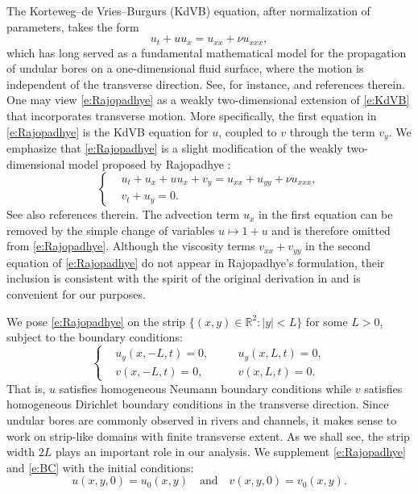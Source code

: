 \documentclass[final,11pt]{article}
\theoremstyle{definition} %
\theoremstyle{plain}
\theoremstyle{definition} %
\theoremstyle{remark}
\begin{document}
The Korteweg--de Vries--Burgurs (KdVB) equation, after normalization of parameters, takes the form
\begin{equation}\label{e:KdVB}
u_t + u u_x = u_{xx} + \nu u_{xxx},
\end{equation}
which has long served as a fundamental mathematical model for the propagation of undular bores on a one-dimensional fluid surface, where the motion is independent of the transverse direction. See, for instance, \cite{BARKER2025} and references therein. 
One may view \eqref{e:Rajopadhye} as a weakly two-dimensional extension of \eqref{e:KdVB} that incorporates transverse motion. More specifically, the first equation in \eqref{e:Rajopadhye} is the KdVB equation for $u$, coupled to $v$ through the term $v_y$. We emphasize that \eqref{e:Rajopadhye} is a slight modification of the weakly two-dimensional model proposed by Rajopadhye \cite{Raj1996}:
\[
\left\{\begin{aligned}
&u_t  +u_x + u u_x  + v_y = u_{xx} + u_{yy} + \nu u_{xxx}, \\
&v_t + u_y = 0.
\end{aligned}\right.
\]
See also references therein. The advection term $u_x$ in the first equation can be removed by the simple change of variables $u \mapsto 1+u$ and is therefore omitted from \eqref{e:Rajopadhye}. Although the viscosity terms $v_{xx}+v_{yy}$ in the second equation of \eqref{e:Rajopadhye} do not appear in Rajopadhye's formulation, their inclusion is consistent with the spirit of the original derivation in \cite{Raj1996} and is convenient for our purposes.    

We pose \eqref{e:Rajopadhye} on the strip $\{(x,y)\in \mathbb{R}^2: |y|<L\}$ for some $L>0$, subject to the boundary conditions: 
\begin{equation}\label{e:BC}
\left\{\begin{aligned}
& u_y(x,-L,t)=0, \quad& &u_y(x,L,t)=0,\\
& v(x,-L,t)=0, & &v(x,L,t)=0.
\end{aligned}\right.
\end{equation}
That is, $u$ satisfies homogeneous Neumann boundary conditions while $v$ satisfies homogeneous Dirichlet boundary conditions in the transverse direction. Since undular bores are commonly observed in rivers and channels, it makes sense to work on strip-like domains with finite transverse extent. As we shall see, the strip width $2L$ plays an important role in our analysis. 
We supplement \eqref{e:Rajopadhye} and \eqref{e:BC} with the initial conditions: 
\begin{equation}\label{e:IC}
u(x,y,0)=u_0(x,y)\quad\text{and}\quad v(x,y,0)=v_0(x,y).
\end{equation}
\end{document}
